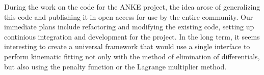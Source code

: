 
During the work on the code for the ANKE project, the idea arose of generalizing this code and publishing it in open access for use by the entire community.
Our immediate plans include refactoring and modifying the existing code, setting up continious integration and development for the project.
In the long term, it seems interesting to create a universal framework that would use a single interface to perform kinematic fitting not only with the method of elimination of differentials, but also using the penalty function or the Lagrange multiplier method.